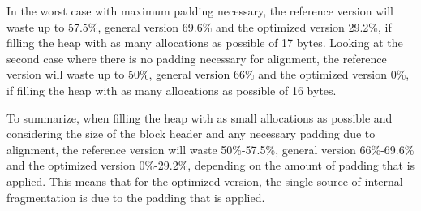 In the worst case with maximum padding necessary, the reference version will waste up to 57.5\%, general version 69.6\% and the optimized version 29.2\%, if filling the heap with as many allocations as possible of 17 bytes. Looking at the second case where there is no padding necessary for alignment, the reference version will waste up to 50\%, general version 66\% and the optimized version 0\%, if filling the heap with as many allocations as possible of 16 bytes.

To summarize, when filling the heap with as small allocations as possible and considering the size of the block header and any necessary padding due to alignment, the reference version will waste 50\%-57.5\%, general version 66\%-69.6\% and the optimized version 0\%-29.2\%, depending on the amount of padding that is applied. This means that for the optimized version, the single source of internal fragmentation is due to the padding that is applied.




















